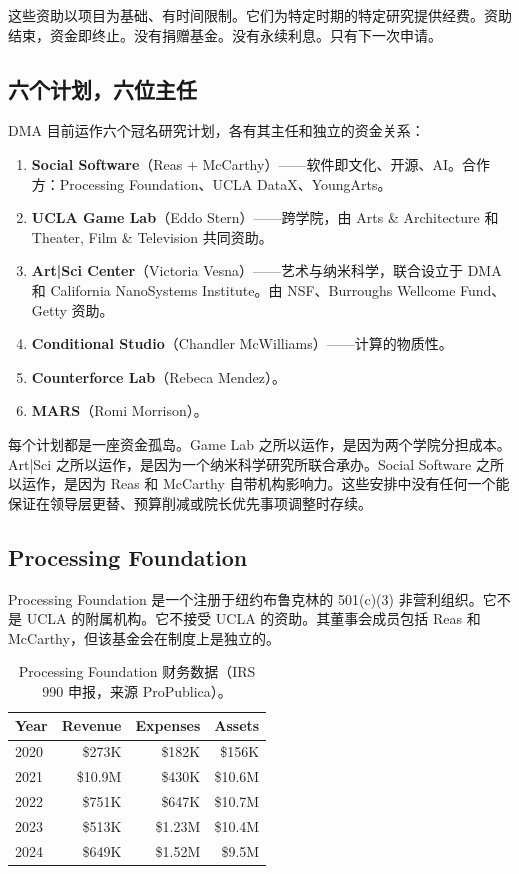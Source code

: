 \documentclass[10pt,letterpaper,twocolumn]{article}
\newcommand{\dma}{\textsc{DMA}}
\begin{document}
这些资助以项目为基础、有时间限制。它们为特定时期的特定研究提供经费。资助结束，资金即终止。没有捐赠基金。没有永续利息。只有下一次申请。

\subsection{六个计划，六位主任}

\dma{} 目前运作六个冠名研究计划，各有其主任和独立的资金关系：

\begin{enumerate}
  \item \textbf{Social Software}（Reas + McCarthy）——软件即文化、开源、AI。合作方：Processing Foundation、UCLA DataX、YoungArts。
  \item \textbf{UCLA Game Lab}（Eddo Stern）——跨学院，由 Arts \& Architecture 和 Theater, Film \& Television 共同资助。
  \item \textbf{Art|Sci Center}（Victoria Vesna）——艺术与纳米科学，联合设立于 \dma{} 和 California NanoSystems Institute。由 NSF、Burroughs Wellcome Fund、Getty 资助。
  \item \textbf{Conditional Studio}（Chandler McWilliams）——计算的物质性。
  \item \textbf{Counterforce Lab}（Rebeca Mendez）。
  \item \textbf{MARS}（Romi Morrison）。
\end{enumerate}

每个计划都是一座资金孤岛。Game Lab 之所以运作，是因为两个学院分担成本。Art|Sci 之所以运作，是因为一个纳米科学研究所联合承办。Social Software 之所以运作，是因为 Reas 和 McCarthy 自带机构影响力。这些安排中没有任何一个能保证在领导层更替、预算削减或院长优先事项调整时存续。

\subsection{Processing Foundation}

Processing Foundation 是一个注册于纽约布鲁克林的 501(c)(3) 非营利组织。它不是 UCLA 的附属机构。它不接受 UCLA 的资助。其董事会成员包括 Reas 和 McCarthy，但该基金会在制度上是独立的。

\begin{table}[h]
\small
\centering
\begin{tabularx}{\columnwidth}{Xrrr}
\toprule
\textbf{Year} & \textbf{Revenue} & \textbf{Expenses} & \textbf{Assets} \\
\midrule
2020 & \$273K & \$182K & \$156K \\
2021 & \$10.9M & \$430K & \$10.6M \\
2022 & \$751K & \$647K & \$10.7M \\
2023 & \$513K & \$1.23M & \$10.4M \\
2024 & \$649K & \$1.52M & \$9.5M \\
\bottomrule
\end{tabularx}
\caption{Processing Foundation 财务数据（IRS 990 申报，来源 ProPublica）。}
\label{tab:pf-financials}
\end{table}
\end{document}
